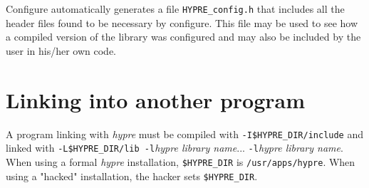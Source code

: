 Configure automatically generates a file \verb+HYPRE_config.h+ that
includes all the header files found to be necessary by configure.
This file may be used to see how a compiled version of the library
was configured and may also be included by the user in his/her own code.

\section{Linking into another program}

A program linking with {\slshape hypre} must be compiled with
\verb+-I$HYPRE_DIR/include+ and linked with
\verb+-L$HYPRE_DIR/lib -l+{\itshape hypre library name}... 
\verb+-l+{\itshape hypre library name}.
When using a formal {\slshape hypre} installation, \verb+$HYPRE_DIR+ is
\verb+/usr/apps/hypre+.
When using a "hacked" installation, the hacker sets \verb+$HYPRE_DIR+.
